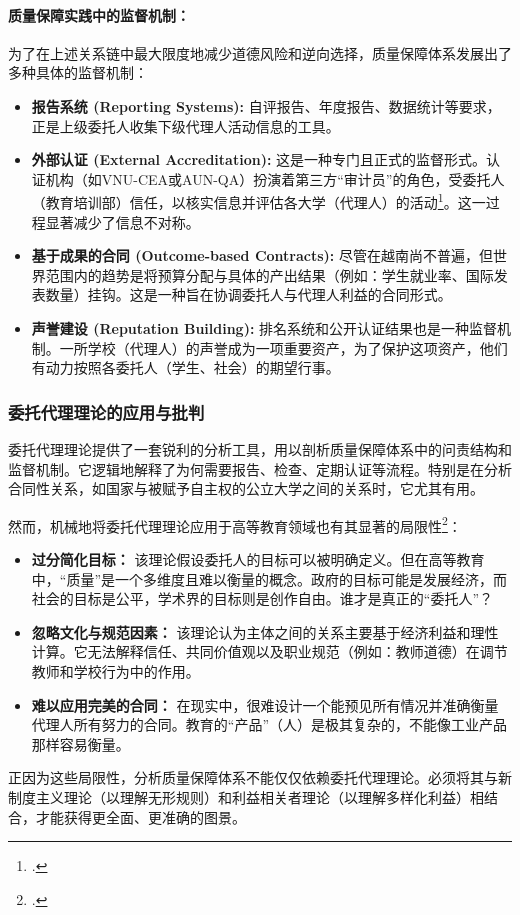 \paragraph{质量保障实践中的监督机制：}
为了在上述关系链中最大限度地减少道德风险和逆向选择，质量保障体系发展出了多种具体的监督机制：
\begin{itemize}
    \item \textbf{报告系统 (Reporting Systems):} 自评报告、年度报告、数据统计等要求，正是上级委托人收集下级代理人活动信息的工具。
    \item \textbf{外部认证 (External Accreditation):} 这是一种专门且正式的监督形式。认证机构（如VNU-CEA或AUN-QA）扮演着第三方“审计员”的角色，受委托人（教育培训部）信任，以核实信息并评估各大学（代理人）的活动\footcite{Borgos2013}。这一过程显著减少了信息不对称。
    \item \textbf{基于成果的合同 (Outcome-based Contracts):} 尽管在越南尚不普遍，但世界范围内的趋势是将预算分配与具体的产出结果（例如：学生就业率、国际发表数量）挂钩。这是一种旨在协调委托人与代理人利益的合同形式。
    \item \textbf{声誉建设 (Reputation Building):} 排名系统和公开认证结果也是一种监督机制。一所学校（代理人）的声誉成为一项重要资产，为了保护这项资产，他们有动力按照各委托人（学生、社会）的期望行事。
\end{itemize}

\subsubsection{委托代理理论的应用与批判}

委托代理理论提供了一套锐利的分析工具，用以剖析质量保障体系中的问责结构和监督机制。它逻辑地解释了为何需要报告、检查、定期认证等流程。特别是在分析合同性关系，如国家与被赋予自主权的公立大学之间的关系时，它尤其有用。

然而，机械地将委托代理理论应用于高等教育领域也有其显著的局限性\footcite{RIHE2022}：
\begin{itemize}
    \item \textbf{过分简化目标：} 该理论假设委托人的目标可以被明确定义。但在高等教育中，“质量”是一个多维度且难以衡量的概念。政府的目标可能是发展经济，而社会的目标是公平，学术界的目标则是创作自由。谁才是真正的“委托人”？
    \item \textbf{忽略文化与规范因素：} 该理论认为主体之间的关系主要基于经济利益和理性计算。它无法解释信任、共同价值观以及职业规范（例如：教师道德）在调节教师和学校行为中的作用。
    \item \textbf{难以应用完美的合同：} 在现实中，很难设计一个能预见所有情况并准确衡量代理人所有努力的合同。教育的“产品”（人）是极其复杂的，不能像工业产品那样容易衡量。
\end{itemize}
正因为这些局限性，分析质量保障体系不能仅仅依赖委托代理理论。必须将其与新制度主义理论（以理解无形规则）和利益相关者理论（以理解多样化利益）相结合，才能获得更全面、更准确的图景。


